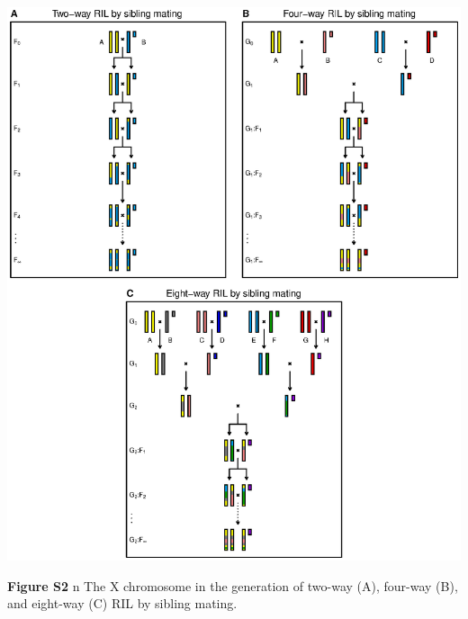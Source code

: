 \documentclass[9pt,letterpaper,twoside]{article}
\begin{document}
\clearpage


{
\centering
\includegraphics[width=\textwidth]{Figs/riXfig.eps}

\bigskip
\textbf{Figure S2} {\color{white} n} The X chromosome in the generation of two-way (A), four-way
(B), and eight-way (C) RIL by sibling mating.
}

\clearpage
\end{document}
